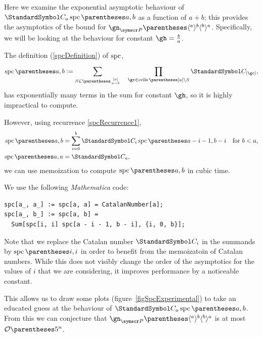 \label{appendixExperimental}
Here we examine the exponential asymptotic behaviour of $\CatalanNumber a\spc\of{a,b}$ as a
function of $a+b$; this provides the asymptotics of the bound for
$\gn_{\pointset P}\of{\langle^a\rangle^b\langle^b\rangle^a}$. Specifically, we will be looking
at the behaviour for constant $\gh=\frac{b}{a}$.

The definition (\ref{spcDefinition}) of $\operatorname{spc}$,\begin{equation*}
\spc\of{a,b}\DefineAs
\sum{S\in\binom{[a]}{a-b}} \quad \prod{\gc\in\cells\of{[a] \setminus S}}\CatalanNumber {\Cardinality \gc}
\text,
\end{equation*}
has exponentially many terms in the sum for constant $\gh$, so it is highly impractical to compute.

However, using recurrence \ref{spcRecurrence1},
\begin{align*}\spc\of{a,b} &= \sum{i=0}[b]
\CatalanNumber {i}
\spc\of{a-i-1,b-i} &\text{for $b<a$,} \\
\spc\of{a,a} &= \CatalanNumber a \text,
\end{align*}
we can use memoization to compute $\spc\of{a,b}$ in cubic time.

We use the following \emph{Mathematica} code:
\begin{verbatim}
spc[a_, a_] := spc[a, a] = CatalanNumber[a];
spc[a_, b_] := spc[a, b] =
  Sum[spc[i, i] spc[a - i - 1, b - i], {i, 0, b}];
\end{verbatim}
Note that we replace the Catalan number $\CatalanNumber i$ in the summands by $\spc\of{i,i}$ in
order to benefit from the memoizatoin of Catalan numbers. While this does not visibly change the
order of the asymptotics for the values of $i$ that we are considering, it improves performance by
a noticeable constant.

This allows us to draw some plots (figure~\ref{figSpcExperimental}) to take an educated guess at
the behaviour of $\CatalanNumber a\spc\of{a,b}$. From this we can conjecture that
$\gn_{\pointset P}\of{\langle^a\rangle^b\langle^b\rangle^a}$ is at most $\BigO\of{5^n}$.

